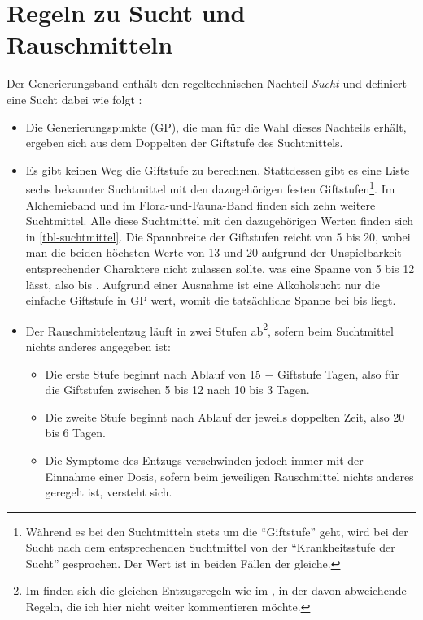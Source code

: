 \chapter{Regeln zu Sucht und Rauschmitteln}
Der Generierungsband  enthält den regeltechnischen Nachteil \emph{Sucht} und definiert eine Sucht dabei wie folgt \cite[S.~271]{WdH}:

\begin{itemize}
	\item Die Generierungspunkte (GP), die man für die Wahl dieses Nachteils erhält, ergeben sich aus dem Doppelten der Giftstufe des Suchtmittels.
	\item Es gibt keinen Weg die Giftstufe zu berechnen. Stattdessen gibt es eine Liste sechs bekannter Suchtmittel mit den dazugehörigen festen Giftstufen\footnote{Während es bei den Suchtmitteln stets um die \enquote{Giftstufe} geht, wird bei der Sucht nach dem entsprechenden Suchtmittel von der \enquote{Krankheitsstufe der Sucht} gesprochen. Der Wert ist in beiden Fällen der gleiche.}. Im Alchemieband  und im Flora-und-Fauna-Band  finden sich zehn weitere Suchtmittel. Alle diese Suchtmittel mit den dazugehörigen Werten finden sich in \vref{tbl-suchtmittel}. Die Spannbreite der Giftstufen reicht von 5 bis 20, wobei man die beiden höchsten Werte von 13 und 20 aufgrund der Unspielbarkeit entsprechender Charaktere nicht zulassen sollte, was eine Spanne von 5 bis 12 lässt, also  bis . Aufgrund einer Ausnahme ist eine Alkoholsucht nur die einfache Giftstufe in GP wert, womit die tatsächliche Spanne bei  bis  liegt.
	\item Der Rauschmittelentzug läuft in zwei Stufen ab\footnote{Im  finden sich die gleichen Entzugsregeln wie im , in der  \cite[S.~225]{ZBA} davon abweichende Regeln, die ich hier nicht weiter kommentieren möchte.}, sofern beim Suchtmittel nichts anderes angegeben ist:
		\begin{itemize}
			\item Die erste Stufe beginnt nach Ablauf von 15 − Giftstufe Tagen, also für die Giftstufen zwischen 5 bis 12 nach 10 bis 3 Tagen.
			\item Die zweite Stufe beginnt nach Ablauf der jeweils doppelten Zeit, also 20 bis 6 Tagen.
			\item Die Symptome des Entzugs verschwinden jedoch immer mit der Einnahme einer Dosis, sofern beim jeweiligen Rauschmittel nichts anderes geregelt ist, versteht sich.
		\end{itemize}

\end{itemize}

